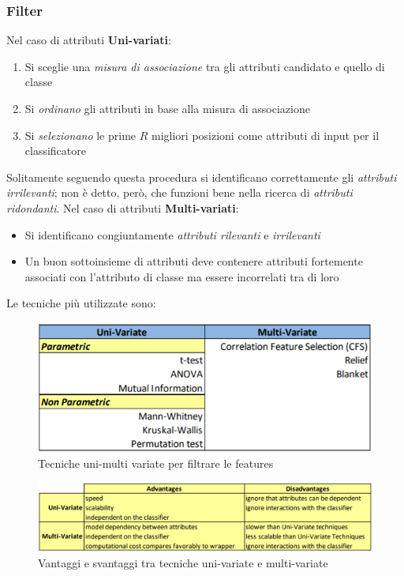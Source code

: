 \subsubsection{Filter} 
Nel caso di attributi \textbf{Uni-variati}: 
\begin{enumerate}
	\item Si sceglie una \textit{misura di associazione} tra gli attributi candidato e quello di classe
	\item Si \textit{ordinano} gli attributi in base alla misura di associazione
	\item Si \textit{selezionano} le prime $R$ migliori posizioni come attributi di input per il classificatore
\end{enumerate}
Solitamente seguendo questa procedura si identificano correttamente gli \textit{attributi irrilevanti}; non è detto, però, che funzioni bene nella ricerca di \textit{attributi ridondanti}.
Nel caso di attributi \textbf{Multi-variati}:
\begin{itemize}
	\item Si identificano congiuntamente \textit{attributi rilevanti} e \textit{irrilevanti}
	\item Un buon sottoinsieme di attributi deve contenere attributi fortemente associati con l'attributo di classe ma essere incorrelati tra di loro
\end{itemize}
Le tecniche più utilizzate sono:
\begin{figure}[H]
	\centering
	\includegraphics[height=0.35 \linewidth]{classification/pict/feature_tecniques.png}
	\caption{Tecniche uni-multi variate per filtrare le features}
\end{figure}
\begin{figure}[H]
	\centering
	\includegraphics[height=0.22 \linewidth]{classification/pict/filter_uni_multi.png}
	\caption{Vantaggi e svantaggi tra tecniche uni-variate e multi-variate}
\end{figure}
